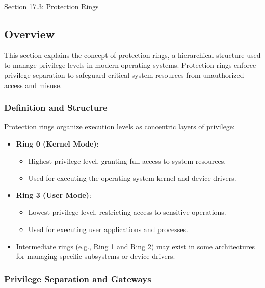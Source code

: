 \begin{notes}{Section 17.3: Protection Rings}
    \subsection*{Overview}

    This section explains the concept of protection rings, a hierarchical structure used to manage privilege levels in modern operating systems. Protection rings enforce privilege separation to 
    safeguard critical system resources from unauthorized access and misuse.
    
    \subsubsection*{Definition and Structure}
    
    Protection rings organize execution levels as concentric layers of privilege:
    \begin{itemize}
        \item \textbf{Ring 0 (Kernel Mode)}:
        \begin{itemize}
            \item Highest privilege level, granting full access to system resources.
            \item Used for executing the operating system kernel and device drivers.
        \end{itemize}
        \item \textbf{Ring 3 (User Mode)}:
        \begin{itemize}
            \item Lowest privilege level, restricting access to sensitive operations.
            \item Used for executing user applications and processes.
        \end{itemize}
        \item Intermediate rings (e.g., Ring 1 and Ring 2) may exist in some architectures for managing specific subsystems or device drivers.
    \end{itemize}
    
    \subsubsection*{Privilege Separation and Gateways}
    

\end{notes}
